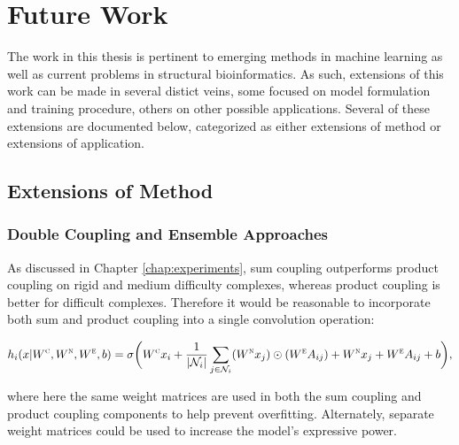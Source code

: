\chapter{Future Work}
\label{chap:future}

The work in this thesis is pertinent to emerging methods in machine learning as well as current problems in structural bioinformatics.
As such, extensions of this work can be made in several distict veins, some focused on model formulation and training procedure, others on other possible applications.
Several of these extensions are documented below, categorized as either extensions of method or extensions of application.

\section{Extensions of Method}

\subsection{Double Coupling and Ensemble Approaches}

As discussed in Chapter \ref{chap:experiments}, sum coupling outperforms product coupling on rigid and medium difficulty complexes, whereas product coupling is better for difficult complexes.
Therefore it would be reasonable to incorporate both sum and product coupling into a single convolution operation:

\begin{equation}
h_i(x | W^\textsc{c}, W^\textsc{n}, W^\textsc{e}, b) = \sigma \bigg( W^{\textsc{c}} x_i + \frac{1}{|\mathcal{N}_i|}\sum_{j \in \mathcal{N}_i} (W^{\textsc{n}} x_j) \odot (W^{\textsc{e}} A_{ij}) + W^{\textsc{n}} x_j + W^{\textsc{e}} A_{ij} + b \bigg),
\label{eq:double_coupling}
\end{equation}

\noindent
where here the same weight matrices are used in both the sum coupling and product coupling components to help prevent overfitting. 
Alternately, separate weight matrices could be used to increase the model's expressive power.

